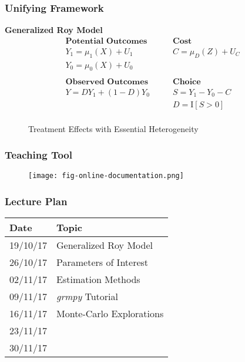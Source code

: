 
\begin{frame}
\frametitle{Unifying Framework}

\textbf{Generalized Roy Model}
\begin{align*}
\textbf{Potential Outcomes} &\qquad \textbf{Cost} \\
Y_1 = \mu_1(X) + U_1      &\qquad C = \mu_D(Z) + U_C \\
Y_0 = \mu_0(X) + U_0      &\qquad \\
    & \\
\textbf{Observed Outcomes} &\qquad \textbf{Choice} \\
Y = D Y_1 + (1 - D)Y_0 &\qquad S = Y_1 - Y_0 - C \\
                       &\qquad D = \mathrm{I}[S > 0] \\
\end{align*}

\end{frame}


\begin{frame}
\begin{figure}[htp]\centering
\caption{Treatment Effects with Essential Heterogeneity}\label{Treatment Effects Conventional}
\end{figure}

\end{frame}


\begin{frame}
\frametitle{Teaching Tool}

\begin{figure}[htp]\centering
	\texttt{[image: fig-online-documentation.png]}
\end{figure}

\end{frame}



\begin{frame}
\frametitle{Lecture Plan}
\begin{longtable}[]{@{}ll@{}}
\toprule
Date & Topic\tabularnewline
\midrule
\endhead
19/10/17 & Generalized Roy Model\tabularnewline
26/10/17 & Parameters of Interest\tabularnewline
02/11/17 & Estimation Methods\tabularnewline
09/11/17 & \emph{grmpy} Tutorial\tabularnewline
16/11/17 & Monte-Carlo Explorations\tabularnewline
23/11/17 &\tabularnewline
30/11/17 &\tabularnewline
\bottomrule
\end{longtable}

\end{frame}


